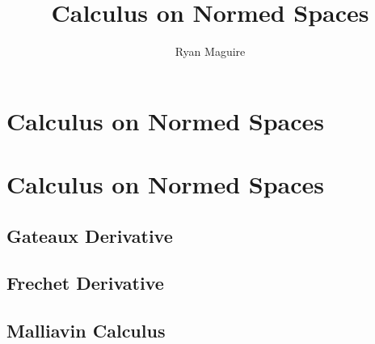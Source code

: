 \documentclass[crop=false,class=book,oneside]{standalone}
\begin{document}
    \ifx\ifmain\undefined
        \title{Calculus on Normed Spaces}
        \author{Ryan Maguire}
        \date{\vspace{-5ex}}
        \maketitle
        \tableofcontents
        \clearpage
        \chapter*{Calculus on Normed Spaces}
        \vspace{10ex}
        \setcounter{chapter}{1}
    \else
        \chapter{Calculus on Normed Spaces}
    \fi
    \section{Gateaux Derivative}
    \section{Frechet Derivative}
    \section{Malliavin Calculus}
\end{document}

